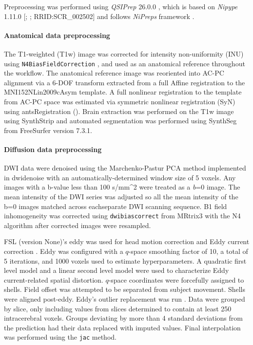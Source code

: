 \documentclass[
]{article}
\author{}
\date{}
\begin{document}
Preprocessing was performed using \emph{QSIPrep} 26.0.0
\citep{cieslak2021qsiprep}, which is based on \emph{Nipype} 1.11.0
{[}\citet{nipype1}; \citet{nipype2}; RRID:SCR\_002502{]} and follows
\emph{NiPreps} framework \citep{nipreps}.

\paragraph{Anatomical data
preprocessing}\label{anatomical-data-preprocessing}

The T1-weighted (T1w) image was corrected for intensity non-uniformity
(INU) using \texttt{N4BiasFieldCorrection} \citep[ANTs 2.4.3]{n4}, and
used as an anatomical reference throughout the workflow. The anatomical
reference image was reoriented into AC-PC alignment via a 6-DOF
transform extracted from a full Affine registration to the
MNI152NLin2009cAsym template. A full nonlinear registration to the
template from AC-PC space was estimated via symmetric nonlinear
registration (SyN) using antsRegistration (\citet{ants}). Brain
extraction was performed on the T1w image using SynthStrip
\citep{synthstrip} and automated segmentation was performed using
SynthSeg \citep{synthseg1, synthseg2} from FreeSurfer version 7.3.1.

\paragraph{Diffusion data
preprocessing}\label{diffusion-data-preprocessing}

DWI data were denoised using the Marchenko-Pastur PCA method implemented
in dwidenoise
\citep{mrtrix3, dwidenoise1, dwidenoise2, cordero2019complex} with an
automatically-determined window size of 5 voxels. Any images with a
b-value less than 100 s/mm\^{}2 were treated as a \emph{b}=0 image. The
mean intensity of the DWI series was adjusted so all the mean intensity
of the b=0 images matched across eachseparate DWI scanning sequence. B1
field inhomogeneity was corrected using \texttt{dwibiascorrect} from
MRtrix3 with the N4 algorithm \citep{n4} after corrected images were
resampled.

FSL (version None)'s eddy was used for head motion correction and Eddy
current correction \citep{anderssoneddy}. Eddy was configured with a
\(q\)-space smoothing factor of 10, a total of 5 iterations, and 1000
voxels used to estimate hyperparameters. A quadratic first level model
and a linear second level model were used to characterize Eddy
current-related spatial distortion. \(q\)-space coordinates were
forcefully assigned to shells. Field offset was attempted to be
separated from subject movement. Shells were aligned post-eddy. Eddy's
outlier replacement was run \citep{eddyrepol}. Data were grouped by
slice, only including values from slices determined to contain at least
250 intracerebral voxels. Groups deviating by more than 4 standard
deviations from the prediction had their data replaced with imputed
values. Final interpolation was performed using the \texttt{jac} method.
\end{document}
